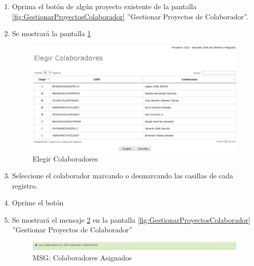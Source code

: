 			\begin{enumerate}
	
			\item Oprima el botón \IUAsignar de algún proyecto existente de la pantalla \ref{fig:GestionarProyectosColaborador} ''Gestionar Proyectos de Colaborador''.
		
			\item Se mostrará la pantalla \ref{fig:ElegirColaboradores}
			
			\begin{figure}[htbp!]
				\begin{center}
					\includegraphics[scale=0.6]{roles/lider/proyectosColaborador/pantallas/IU4-1elegirColaboradores}
					\caption{Elegir Colaboradores}
					\label{fig:ElegirColaboradores}
				\end{center}
			\end{figure}
		
		\item Seleccione el colaborador marcando o desmarcando las casillas de cada registro.
		
		\item Oprime el botón \IUAceptar
		
		\item Se mostrará el mensaje \ref{fig:colaboradorElegido} en la pantalla \ref{fig:GestionarProyectosColaborador} ''Gestionar Proyectos de Colaborador''
						
			\begin{figure}[htbp!]
				\begin{center}
					\includegraphics[scale=0.6]{roles/lider/proyectosColaborador/pantallas/IU4-1MSG1}
					\caption{MSG: Colaboradores Asignados}
					\label{fig:colaboradorElegido}
				\end{center}
			\end{figure}
			\end{enumerate}
